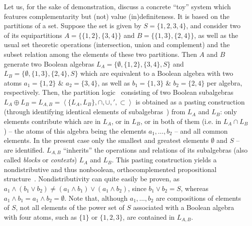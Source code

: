 \documentclass[%
 preprint,
 showpacs,
 showkeys,
 preprintnumbers,
 amsmath,amssymb,
 aps,
 pra,
  longbibliography,
 ]{revtex4-1}
\begin{document}
Let us, for the sake of demonstration,
discuss a concrete ``toy'' system which features complementarity but (not) value (in)definiteness.
It is based on the partitions of a set.
Suppose the set is given by
$S=\{1,2,3,4\}$,
and consider two of its equipartitions
$A=\{\{1,2\},\{3,4\}\}$
and
$B=\{\{1,3\},\{2,4\}\}$, as well as
the usual set theoretic operations (intersection, union and complement) and
the subset relation among the elements of these two partitions.
Then $A$ and $B$ generate two Boolean algebras
$L_A= \{\emptyset ,\{1,2\},\{3,4\},S\}$
and
$L_B= \{\emptyset ,\{1,3\},\{2,4\},S\}$
which are equivalent to a Boolean algebra with two atoms
$a_1=\{1,2\}$ \& $a_2=\{3,4\}$, as well as
$b_1=\{1,3\}$  \& $b_2=\{2,4\}$
per algebra, respectively.
Then, the partition logic~\cite{svozil-ql,svozil-2001-eua,svozil-2008-ql}
consisting of two Boolean subalgebras
$L_A \oplus L_B = L_{A,B} = \left\langle \{L_A,L_B\},\cap, \cup, ',\subset \right\rangle $
is obtained as a pasting construction (through identifying identical elements of subalgebras~\cite{greechie:71,nav:91,kalmbach-81})
from $L_A$ and $L_B$:
only elements contribute which are in $L_A$, or in $L_B$, or in both of them  (i.e. in $L_A \cap L_B$)
-- the atoms of this algebra being the elements  $a_1,\ldots ,b_2$ --
and all common elements. In the present case only the smallest and greatest elements $\emptyset$
and $S$  --  are identified.
$L_{A,B}$ ``inherits'' the operations and relations of its subalgebras (also called {\em blocks}
or {\em contexts}) $L_A$ and $L_B$.
This pasting construction yields a nondistributive and thus
nonboolean, orthocomplemented propositional structure~\cite{kalmbach-81,pulmannova-91}.
Nondistributivity can quite easily be proven,
as  $a_1 \wedge (b_1 \vee b_2) \neq  (a_1 \wedge b_1) \vee (a_1 \wedge b_2)$,
since $b_1 \vee b_2=S$, whereas  $a_1 \wedge b_1= a_1 \wedge b_2 =\emptyset$.
Note that, although $a_1,\ldots ,b_2$ are compositions of elements of $S$,
not all elements of the power set  of $S$ associated with a Boolean algebra with four atoms,  such
as $\{1\}$ or $\{1,2,3\}$, are contained in $L_{A,B}$.
\end{document}
